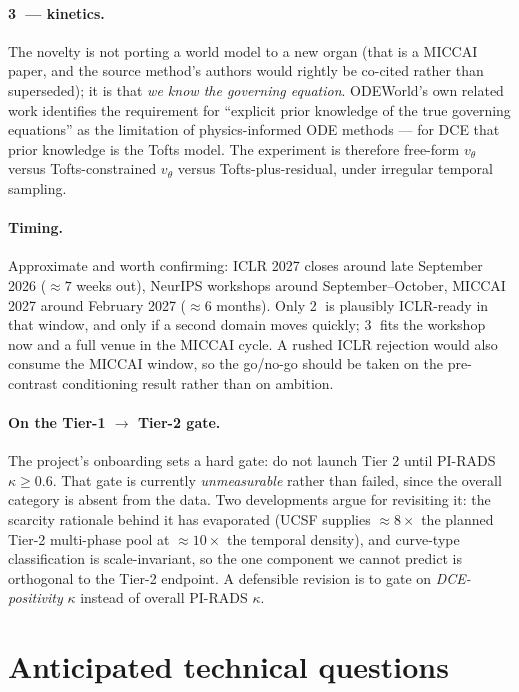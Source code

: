 \documentclass[11pt]{article}
\newcommand{\1}{\mathbb{1}}
\begin{document}
\paragraph{\textcircled{3} --- kinetics.} The novelty is not porting a world model to a new
organ (that is a MICCAI paper, and the source method's authors would rightly be co-cited
rather than superseded); it is that \emph{we know the governing equation}. ODEWorld's own
related work identifies the requirement for ``explicit prior knowledge of the true governing
equations'' as the limitation of physics-informed ODE methods --- for DCE that prior knowledge
is the Tofts model. The experiment is therefore free-form $v_\theta$ versus Tofts-constrained
$v_\theta$ versus Tofts-plus-residual, under irregular temporal sampling.

\paragraph{Timing.} Approximate and worth confirming: ICLR 2027 closes around late September
2026 ($\approx7$ weeks out), NeurIPS workshops around September--October, MICCAI 2027 around
February 2027 ($\approx6$ months). Only \textcircled{2} is plausibly ICLR-ready in that
window, and only if a second domain moves quickly; \textcircled{3} fits the workshop now and
a full venue in the MICCAI cycle. A rushed ICLR rejection would also consume the MICCAI
window, so the go/no-go should be taken on the pre-contrast conditioning result rather than
on ambition.

\paragraph{On the Tier-1 $\to$ Tier-2 gate.} The project's onboarding sets a hard gate:
do not launch Tier 2 until PI-RADS $\kappa\ge0.6$. That gate is currently \emph{unmeasurable}
rather than failed, since the overall category is absent from the data. Two developments
argue for revisiting it: the scarcity rationale behind it has evaporated (UCSF supplies
$\approx8\times$ the planned Tier-2 multi-phase pool at $\approx10\times$ the temporal
density), and curve-type classification is scale-invariant, so the one component we cannot
predict is orthogonal to the Tier-2 endpoint. A defensible revision is to gate on
\emph{DCE-positivity} $\kappa$ instead of overall PI-RADS $\kappa$.

\section{Anticipated technical questions}
\end{document}
